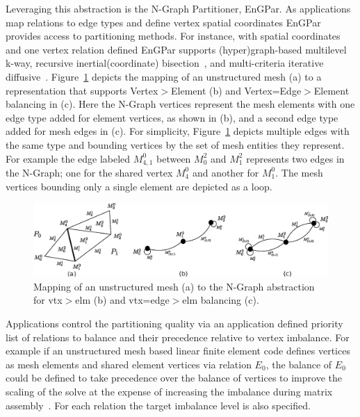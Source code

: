 \documentclass[12pt]{article}
\begin{document}
Leveraging this abstraction is the N-Graph Partitioner, EnGPar.
As applications map relations to edge types and define vertex spatial
coordinates EnGPar provides access to partitioning methods.
For instance, with spatial coordinates and one vertex relation defined EnGPar
supports (hyper)graph-based multilevel k-way, recursive inertial(coordinate)
bisection~\cite{williamsRIB}, and multi-criteria iterative
diffusive~\cite{Smith2015}.
Figure~\ref{fig:meshMapping} depicts the mapping of an unstructured mesh (a) to
a representation that supports Vertex$>$Element (b) and Vertex=Edge$>$Element
balancing in (c).
Here the N-Graph vertices represent the mesh elements with one edge type added
for element vertices, as shown in (b), and a second edge type added for mesh
edges in (c).
For simplicity, Figure~\ref{fig:meshMapping} depicts multiple edges with the same
type and bounding vertices by the set of mesh entities they represent.
For example the edge labeled $M^0_{4,1}$ between  $M^2_0$ and $M^2_1$ represents
two edges in the N-Graph; one for the shared vertex  $M^0_4$ and another for
$M^0_1$.
The mesh vertices bounding only a single element are depicted as a loop. 

\begin{figure}
  \includegraphics[width=\textwidth]{meshToNgraph.eps}
  \caption{\label{fig:meshMapping}
    Mapping of an unstructured mesh (a) to the N-Graph abstraction for vtx$>$elm
    (b) and vtx=edge$>$elm balancing (c).
  }
\end{figure}

Applications control the partitioning quality via an application defined
priority list of relations to balance and their precedence relative to vertex
imbalance.
For example if an unstructured mesh based linear finite element code defines
vertices as mesh elements and shared element vertices via relation $E_0$, the
balance of $E_0$ could be defined to take precedence over the balance of
vertices to improve the scaling of the solve at the expense of increasing the
imbalance during matrix
assembly~\cite{Zhou2010,rasquinCise2014,zhou2012unstructured,zhou2012tools}.
For each relation the target imbalance level is also specified.
\end{document}
